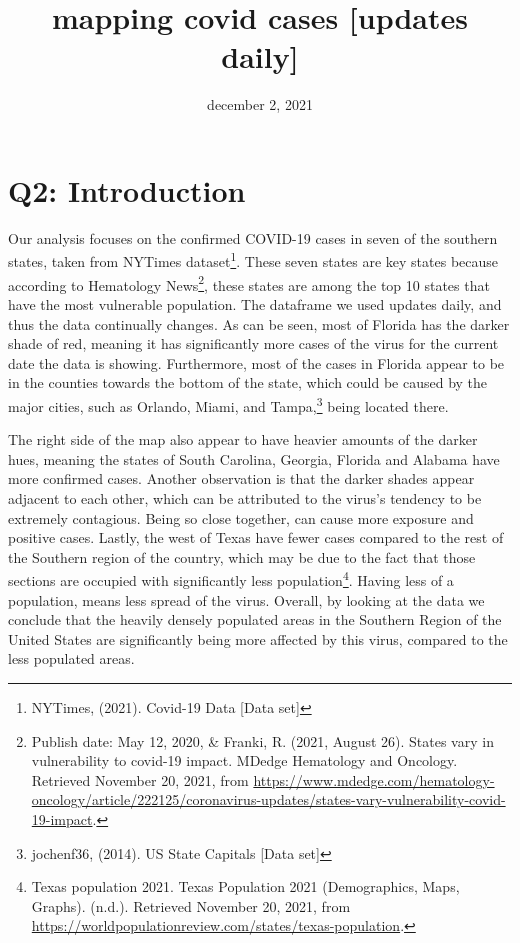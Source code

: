 \documentclass[
]{article}
\title{mapping covid cases {[}updates daily{]}}
\author{}
\date{\vspace{-2.5em}december 2, 2021}
\begin{document}
\maketitle

\hypertarget{q2-introduction}{%
\section{Q2: Introduction}\label{q2-introduction}}

Our analysis focuses on the confirmed COVID-19 cases in seven of the
southern states, taken from NYTimes dataset\footnote{NYTimes, (2021).
  Covid-19 Data {[}Data set{]}}. These seven states are key states
because according to Hematology News\footnote{Publish date: May 12,
  2020, \& Franki, R. (2021, August 26). States vary in vulnerability to
  covid-19 impact. MDedge Hematology and Oncology. Retrieved November
  20, 2021, from
  \url{https://www.mdedge.com/hematology-oncology/article/222125/coronavirus-updates/states-vary-vulnerability-covid-19-impact}.},
these states are among the top 10 states that have the most vulnerable
population. The dataframe we used updates daily, and thus the data
continually changes. As can be seen, most of Florida has the darker
shade of red, meaning it has significantly more cases of the virus for
the current date the data is showing. Furthermore, most of the cases in
Florida appear to be in the counties towards the bottom of the state,
which could be caused by the major cities, such as Orlando, Miami, and
Tampa,\footnote{jochenf36, (2014). US State Capitals {[}Data set{]}}
being located there.

The right side of the map also appear to have heavier amounts of the
darker hues, meaning the states of South Carolina, Georgia, Florida and
Alabama have more confirmed cases. Another observation is that the
darker shades appear adjacent to each other, which can be attributed to
the virus's tendency to be extremely contagious. Being so close
together, can cause more exposure and positive cases. Lastly, the west
of Texas have fewer cases compared to the rest of the Southern region of
the country, which may be due to the fact that those sections are
occupied with significantly less population\footnote{Texas population
  2021. Texas Population 2021 (Demographics, Maps, Graphs). (n.d.).
  Retrieved November 20, 2021, from
  \url{https://worldpopulationreview.com/states/texas-population}.}.
Having less of a population, means less spread of the virus. Overall, by
looking at the data we conclude that the heavily densely populated areas
in the Southern Region of the United States are significantly being more
affected by this virus, compared to the less populated areas.
\end{document}
